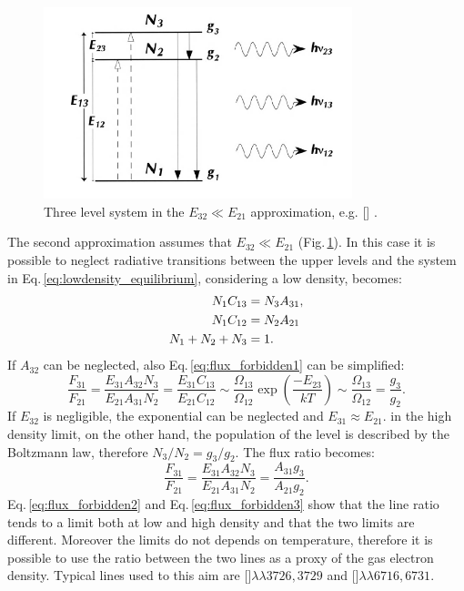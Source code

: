 \documentclass[../main.tex]{subfiles}
\begin{document}
\begin{figure}
\centering
\includegraphics[width=0.8\textwidth]{images/s2_scheme.png} 
\caption[]{Three level system in the $E_{32}\ll E_{21}$ approximation, e.g. [] \citep{Dopita03}.  }
\label{fig:s2_scheme}
\end{figure}

The second approximation assumes that $E_{32}\ll E_{21}$ (Fig.\,\ref{fig:s2_scheme}).
In this case it is possible to neglect radiative transitions between the upper levels and the system in Eq.\,\ref{eq:lowdensity_equilibrium}, considering a low density, becomes:
\begin{align}
    \label{eq:lowdensity_equilibrium1}
    N_1 C_{13} &= N_3A_{31}, \notag\\
    N_1 C_{12} &= N_2A_{21}\\
    N_1+N_2+N_3 &= 1. \notag
\end{align}
If $A_{32}$ can be neglected, also Eq.\,\ref{eq:flux_forbidden1} can be simplified:
\begin{equation}
    \label{eq:flux_forbidden2}
    \frac{F_{31}}{F_{21}} = \frac{E_{31}A_{32}N_3}{E_{21}A_{31}N_2} = \frac{E_{31}C_{13}}{E_{21}C_{12}}\sim\frac{\Omega_{13}}{\Omega_{12}}\exp \left(\frac{-E_{23}}{kT}\right)\sim\frac{\Omega_{13}}{\Omega_{12}} = \frac{g_3}{g_2}.
\end{equation}
If $E_{32}$ is negligible, the exponential can be neglected and $E_{31}\approx E_{21}$.
in the high density limit, on the other hand, the population of the level is described by the Boltzmann law, therefore $N_3/N_2 = g_3/g_2$.
The flux ratio becomes:
\begin{equation}
    \label{eq:flux_forbidden3}
    \frac{F_{31}}{F_{21}} = \frac{E_{31}A_{32}N_3}{E_{21}A_{31}N_2} = \frac{A_{31}g_3}{A_{21}g_2}.
\end{equation}
Eq.\,\ref{eq:flux_forbidden2} and Eq.\,\ref{eq:flux_forbidden3} show that the line ratio tends to a limit both at low and high density and that the two limits are different.
Moreover the limits do not depends on temperature, therefore it is possible to use the ratio between the two lines as a proxy of the gas electron density.
Typical lines used to this aim are []$\lambda\lambda3726,3729$ and []$\lambda\lambda6716,6731$.
\end{document}
